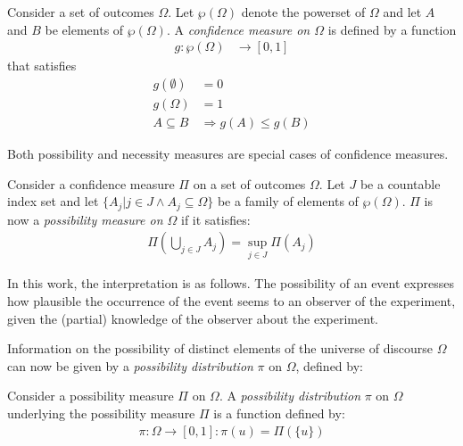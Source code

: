 \begin{definition}
Consider a set of outcomes $\Omega$. Let $\wp(\Omega)$ denote the powerset of $\Omega$ and let $A$ and $B$ be elements of $\wp(\Omega)$. A \emph{confidence measure on $\Omega$} is defined by a function
	\begin{align}
	g : \wp(\Omega) & \rightarrow \left[0,1\right]
	\end{align}
that satisfies
	\begin{align}
	g(\emptyset) &= 0 \\
	g(\Omega) &= 1 	\label{NormalizationProperty} \\
	A \subseteq B &\Rightarrow g(A) \leq g(B) \label{MonotonicityProperty}
	\end{align}
\end{definition}

Both possibility and necessity measures are special cases of confidence measures.



\begin{definition}
Consider a confidence measure $\Pi$ on a set of outcomes $\Omega$. Let $J$ be a countable index set and let $\{ A_{j} | j \in J \wedge A_{j} \subseteq \Omega \}$ be a family of elements of $\wp(\Omega)$. $\Pi$ is now a \emph{possibility measure on $\Omega$} if it satisfies:
	\begin{align}
	\Pi\left(\bigcup_{j \in J} A_{j} \right) = \sup_{j \in J} \Pi(A_{j})
	\end{align}
\end{definition}

In this work, the interpretation is as follows. The possibility of an event expresses how plausible the occurrence of the event seems to an observer of the experiment, given the (partial) knowledge of the observer about the experiment.

Information on the possibility of distinct elements of the universe of discourse $\Omega$ can now be given by a \emph{possibility distribution} $\pi$ on $\Omega$, defined by:

\begin{definition}
Consider a possibility measure $\Pi$ on $\Omega$. A \emph{possibility distribution} $\pi$ on $\Omega$ underlying the possibility measure $\Pi$ is a function defined by:
	\begin{align}
	\pi : \Omega \rightarrow \left[0, 1\right] : \pi(u) = \Pi(\{u\})
	\end{align}
\end{definition}

